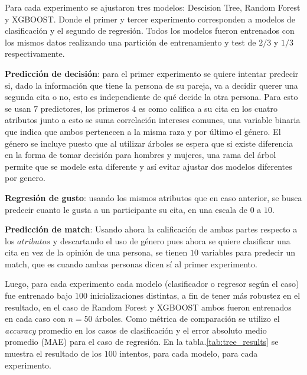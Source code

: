 Para cada experimento se ajustaron tres modelos: Descision Tree, Random Forest y XGBOOST. Donde el primer y tercer experimento corresponden a modelos de clasificación y el segundo de regresión. Todos los modelos fueron entrenados con los mismos datos realizando una partición de entrenamiento y test de $2/3$ y $1/3$ respectivamente.


\textbf{Predicción de decisión}: para el primer experimento se quiere intentar predecir si, dado la información que tiene la persona de su pareja, va a decidir querer una segunda cita o no, esto es independiente de qué decide la otra persona. Para esto se usan $7$ predictores, los primeros $4$ es como califica a su cita en los cuatro atributos junto a esto se suma correlación intereses comunes, una variable binaria que indica que ambos pertenecen a la misma raza y por último el género. El género se incluye puesto que al utilizar árboles se espera que si existe diferencia en la forma de tomar decisión para hombres y mujeres, una rama del árbol permite que se modele esta diferente y así evitar ajustar dos modelos diferentes por genero.


\textbf{Regresión de gusto}: usando los mismos atributos que en caso anterior, se busca predecir cuanto le gusta a un participante su cita, en una escala de $0$ a $10$.

\textbf{Predicción de match}: Usando ahora la calificación de ambas partes respecto a los $atributos$ y descartando el uso de género pues ahora se quiere clasificar una cita en vez de la opinión de una persona, se tienen $10$ variables para predecir un match, que es cuando ambas personas dicen sí al primer experimento.

Luego, para cada experimento cada modelo (clasificador o regresor según el caso) fue entrenado bajo $100$ inicializaciones distintas, a fin de tener más robustez en el resultado, en el caso de Random Forest y XGBOOST ambos fueron entrenados en cada caso con $n=50$ árboles. Como métrica de comparación se utilizo el \textit{accuracy} promedio en los casos de clasificación y el error absoluto medio promedio (MAE) para el caso de regresión.
En la tabla.\ref{tab:tree_results} se muestra el resultado de los $100$ intentos, para cada modelo, para cada experimento.

